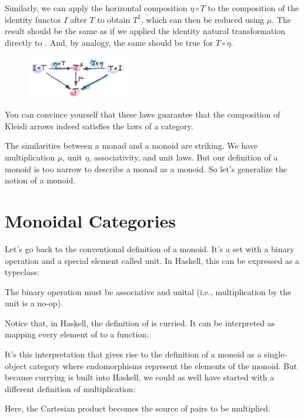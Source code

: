 \noindent
Similarly, we can apply the horizontal composition $\eta \circ T$ to the
composition of the identity functor $I$ after $T$ to
obtain $T^2$, which can then be reduced using $\mu$. The
result should be the same as if we applied the identity natural
transformation directly to . And, by analogy, the same should
be true for $T \circ \eta$.

\begin{figure}[H]
  \centering
  \includegraphics[width=0.4\textwidth]{images/unitlawcomp-1.png}
\end{figure}

\noindent
You can convince yourself that these laws guarantee that the composition
of Kleisli arrows indeed satisfies the laws of a category.

The similarities between a monad and a monoid are striking. We have
multiplication $\mu$, unit $\eta$, associativity, and unit laws. But our
definition of a monoid is too narrow to describe a monad as a monoid. So
let's generalize the notion of a monoid.

\section{Monoidal Categories}

Let's go back to the conventional definition of a monoid. It's a set
with a binary operation and a special element called unit. In Haskell,
this can be expressed as a typeclass:

The binary operation  must be associative and unital
(i.e., multiplication by the unit  is a no-op).

Notice that, in Haskell, the definition of  is curried.
It can be interpreted as mapping every element of  to a
function:

It's this interpretation that gives rise to the definition of a monoid
as a single-object category where endomorphisms
 represent the elements of the monoid.
But because currying is built into Haskell, we could as well have
started with a different definition of multiplication:

Here, the Cartesian product  becomes the source of pairs
to be multiplied.

